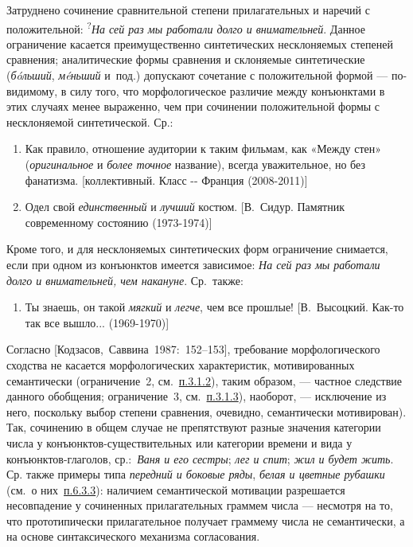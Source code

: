 Затруднено сочинение сравнительной степени прилагательных и наречий с
положительной: \textsuperscript{?}\textit{На сей раз мы работали долго и
  внимательней}. Данное ограничение касается преимущественно синтетических
несклоняемых степеней сравнения; аналитические формы сравнения и
склоняемые синтетические (\textit{бóльший}, \textit{мéньший} и~под.)
допускают сочетание с положительной формой --- по-видимому, в силу того,
что морфологическое различие между конъюнктами в этих случаях менее
выраженно, чем при сочинении положительной формы с несклоняемой
синтетической. Ср.:

\begin{enumerate}
  \def\labelenumi{(\arabic{enumi})}
  \setcounter{enumi}{6}
  \item
        Как правило, отношение аудитории к таким фильмам, как «Между стен»
        (\textit{оригинальное} и \textit{более точное} название), всегда
        уважительное, но без фанатизма. {[}коллективный. Класс -\/- Франция
        (2008-2011){]}
  \item
        Одел свой \textit{единственный} и \textit{лучший} костюм. {[}В.~Сидур.
        Памятник современному состоянию (1973-1974){]}
\end{enumerate}

Кроме того, и для несклоняемых синтетических форм ограничение снимается,
если при одном из конъюнктов имеется зависимое: \textit{На сей раз мы
  работали долго и внимательней, чем накануне}. Ср.~также:

\begin{enumerate}
  \def\labelenumi{(\arabic{enumi})}
  \setcounter{enumi}{8}
  \item
        Ты знаешь, он такой \textit{мягкий} и \textit{легче}, чем все прошлые!
        {[}В.~Высоцкий. Как-то так все вышло... (1969-1970){]}
\end{enumerate}

Согласно {[}Кодзасов,~Саввина~1987:~152--153{]}, требование
морфологического сходства не касается морфологических характеристик,
мотивированных семантически (ограничение~2, см.~\underline{п.3.1.2}),
таким образом, --- частное следствие данного обобщения; ограничение~3,
см.~\underline{п.3.1.3}), наоборот, --- исключение из него, поскольку
выбор степени сравнения, очевидно, семантически мотивирован). Так,
сочинению в общем случае не препятствуют разные значения категории числа
у конъюнктов-существительных или категории времени и вида у
конъюнктов-глаголов, ср.:~\textit{Ваня и его сестры}; \textit{лег и спит};
\textit{жил и будет жить}. Ср. также примеры типа \textit{передний и боковые
  ряды}, \textit{белая и цветные рубашки} (см.~о них~\underline{п.6.3.3}):
наличием семантической мотивации разрешается несовпадение у сочиненных
прилагательных граммем числа --- несмотря на то, что прототипически
прилагательное получает граммему числа не семантически, а на основе
синтаксического механизма согласования.


